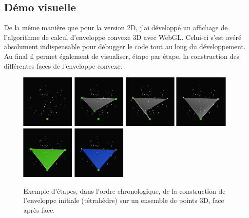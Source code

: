\documentclass[]{article}
\begin{document}
\subsection{Démo visuelle}
De la même manière que pour la version 2D, j'ai développé un affichage de l'algorithme de calcul d'enveloppe convexe 3D avec WebGL. Celui-ci s'est avéré absolument indispensable pour débugger le code tout au long du développement. Au final il permet également de visualiser, étape par étape, la construction des différentes faces de l'enveloppe convexe.

\begin{figure}[H]
	\includegraphics[width=2.65cm]{qh3d/demo3d/init_6.png}
	\includegraphics[width=2.65cm]{qh3d/demo3d/init_5.png}
	\includegraphics[width=2.65cm]{qh3d/demo3d/init_4.png}
	\includegraphics[width=2.65cm]{qh3d/demo3d/init_3.png}
	\includegraphics[width=2.65cm]{qh3d/demo3d/init_2.png}
	\includegraphics[width=2.65cm]{qh3d/demo3d/init_1.png}
	\caption{Exemple d'étapes, dans l'ordre chronologique, de la construction de l'enveloppe initiale (tétrahèdre) sur un ensemble de points 3D, face après face.}
\end{figure}
\end{document}
